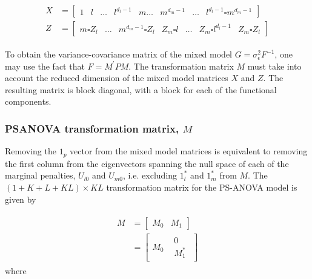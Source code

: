 \documentclass[12pt]{article}
\newcommand{\ms}{\scriptscriptstyle}
\theoremstyle{definition}
\begin{document}
\begin{align} 
\begin{split} \label{eq:PSANOVA-fixed-random-effect-matrices}
X &= \left[ \begin{array}{c|c|c|c|c|c|c|c|c} 1 & l  & \dots & l^{\ms d_{\ms l}-1}& m \dots & m^{\ms d_{\ms m}-1} & \dots &  l^{\ms d_{\ms l}-1} \square m^{\ms d_{\ms m}-1} \end{array} \right] \\
Z &= \left[ \begin{array}{c|c|c|c|c|c|c} m \square Z_l & \dots &  m^{\ms d_{\ms m}-1} \square Z_l & Z_m \square l & \dots & Z_m \square  l^{\ms d_{\ms l}-1} & Z_m \square Z_l \end{array} \right]
\end{split}
\end{align}

To obtain the variance-covariance matrix of the mixed model $G = \sigma_\epsilon^2 F^{-1}$, one may use the fact that $F = M^\prime P M$. The transformation matrix $M$ must take into account the reduced dimension of the mixed model matrices $X$ and $Z$. The resulting matrix is block diagonal, with a block for each of the functional components. 

\subsubsection{PSANOVA transformation matrix, $M$}

Removing the $1_p$ vector from the mixed model matrices is equivalent to removing the first column from the eigenvectors spanning the null space of each of the marginal penalties, $U_{l0}$ and $U_{m0}$, i.e. excluding $1_l^*$ and  $1_m^*$ from $M$. The $\left( 1 + K + L + KL \right) \times KL$ transformation matrix for the PS-ANOVA model is given by 

\begin{align}
\begin{split}
M &= \left[ \begin{array}{c|c}  M_0 & M_1  \end{array} \right] \\
&= \left[ \begin{array}{c|c}  M_0 & \begin{array}{c} 0 \\ M_1^* \end{array}  \end{array} \right] 
\end{split}
\end{align}
\noindent
where
\end{document}
